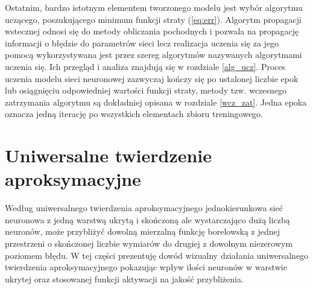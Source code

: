 \documentclass[11pt]{book}
\theoremstyle{definition}
\begin{document}
Ostatnim, bardzo istotnym elementem tworzonego modelu jest wybór algorytmu uczącego, poszukującego minimum funkcji straty (\ref{eq:err}). Algorytm propagacji wstecznej odnosi się do metody obliczania pochodnych i pozwala na propagację informacji o błędzie do parametrów sieci lecz realizacja uczenia się za jego pomocą wykorzystywana jest przez szereg algorytmów nazywanych algorytmami uczenia się. Ich przegląd i analiza znajdują się w rozdziale \ref{alg_ucz}. Proces uczenia modelu sieci neuronowej zazwyczaj kończy się po ustalonej liczbie epok lub osiągnięciu odpowiedniej wartości funkcji straty, metody tzw. wczesnego zatrzymania algorytmu są dokładniej opisana w rozdziale \ref{wcz_zat}. Jedna epoka oznacza jedną iterację po wszystkich elementach zbioru treningowego.


\section{Uniwersalne twierdzenie aproksymacyjne}


Według uniwersalnego twierdzenia aproksymacyjnego jednokierunkowa sieć neuronowa z jedną warstwą ukrytą i skończoną ale wystarczająco dużą liczbą neuronów, może przybliżyć dowolną mierzalną funkcję borelowską z jednej przestrzeni o skończonej liczbie wymiarów do drugiej z dowolnym niezerowym poziomem błędu. W tej części prezentuję dowód wizualny działania uniwersalnego twierdzenia aproksymacyjnego pokazując wpływ ilości neuronów w warstwie ukrytej oraz stosowanej funkcji aktywacji na jakość przybliżenia.
\end{document}
